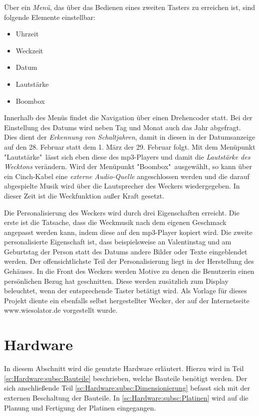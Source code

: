 \documentclass[journal, a4paper]{IEEEtran}
\begin{document}
	Über ein \textit{Menü}, das über das Bedienen eines zweiten Tasters zu erreichen ist, sind folgende Elemente einstellbar:
	\begin{itemize}[leftmargin=20mm]
	\item Uhrzeit
	\item Weckzeit
	\item Datum
	\item Lautstärke
	\item Boombox
	\end{itemize}
	Innerhalb des Menüs findet die Navigation über einen Drehencoder statt.	Bei der Einstellung des Datums wird neben Tag und Monat auch das Jahr abgefragt. Dies dient der \textit{Erkennung von Schaltjahren}, damit in diesen in der Datumsanzeige auf den 28. Februar statt dem 1. März der 29. Februar folgt. Mit dem Menüpunkt "Lautstärke"\ lässt sich eben diese des mp3-Players und damit die \textit{Lautstärke des Wecktons} verändern. Wird der Menüpunkt "Boombox"\ ausgewählt, so kann über ein Cinch-Kabel eine \textit{externe Audio-Quelle} angeschlossen werden und die darauf abgespielte Musik wird über die Lautsprecher des Weckers wiedergegeben. In dieser Zeit ist die Weckfunktion außer Kraft gesetzt.\par
	Die Personalisierung des Weckers wird durch drei Eigenschaften erreicht. Die erste ist die Tatsache, dass die Weckmusik nach dem eigenen Geschmack angepasst werden kann, indem diese auf den mp3-Player kopiert wird. Die zweite personalisierte Eigenschaft ist, dass beispielsweise an Valentinstag und am Geburtstag der Person statt des Datums andere Bilder oder Texte eingeblendet werden. Der offensichtlichste Teil der Personalisierung liegt in der Herstellung des Gehäuses. In die Front des Weckers werden Motive zu denen die Benutzerin einen persönlichen Bezug hat geschnitten. Diese werden zusätzlich zum Display beleuchtet, wenn der entsprechende Taster betätigt wird.
	Als Vorlage für dieses Projekt diente ein ebenfalls selbst hergestellter Wecker, der auf der Internetseite www.wiesolator.de vorgestellt wurde. 
\section{Hardware}
	In diesem Abschnitt wird die genutzte Hardware erläutert. Hierzu wird in Teil \ref{sc:Hardware:subsc:Bauteile} beschrieben, welche Bauteile benötigt werden. Der sich anschließende Teil \ref{sc:Hardware:subsc:Dimensionierung} befasst sich mit der externen Beschaltung der Bauteile. In \ref{sc:Hardware:subsc:Platinen} wird auf die Planung und Fertigung der Platinen eingegangen.
\end{document}
